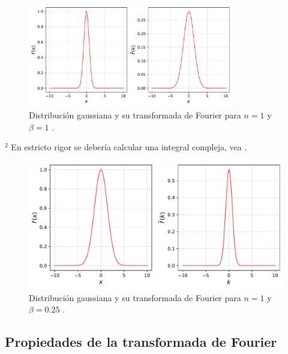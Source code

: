\begin{ejemplo}
    \begin{figure}[H]
        \centering
        \includegraphics[width = 0.8\textwidth]{Figuras/EjemploTransformada2.pdf}
        \caption{Distribución gaussiana y su transformada de Fourier para $n=1$ y $\beta =1$ .}
        \label{Espectro3}
    \end{figure}
        \footnoterule
        
        {\footnotesize
        $^2$ En estricto rigor se debería calcular una integral compleja, vea \cite{Arfken}.
        }



    \begin{figure}[H]
        \centering
        \includegraphics[scale = 0.6]{Figuras/EjemploTransformada3.pdf}
        \caption{Distribución gaussiana y su transformada de Fourier para $n=1$ y $\beta =0.25$ .}
        \label{Espectro4}
    \end{figure}
\end{ejemplo}


\subsection{Propiedades de la transformada de Fourier}

